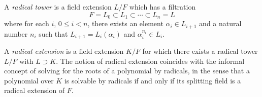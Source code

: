 \documentclass[12pt]{article}
\begin{document}
A {\em radical tower} is a field extension $L/F$ which has a filtration
$$
F = L_0 \subset L_1 \subset \cdots \subset L_n = L
$$
where for each $i$, $0 \leq i < n$, there exists an element $\alpha_i \in L_{i+1}$ and a natural number $n_i$ such that $L_{i+1} = L_i(\alpha_i)$ and $\alpha_i^{n_i} \in L_i$.

A {\em radical extension} is a field extension $K/F$ for which there exists a radical tower $L/F$ with $L \supset K$. The notion of radical extension coincides with the informal concept of solving for the roots of a polynomial by radicals, in the sense that a polynomial over $K$ is solvable by radicals if and only if its splitting field is a radical extension of $F$.
\end{document}
